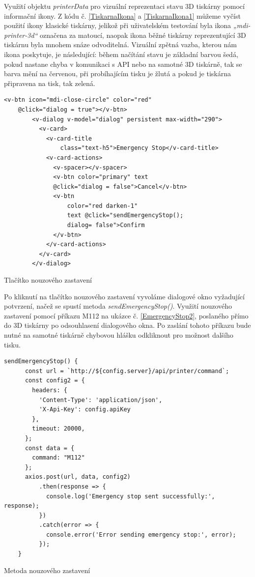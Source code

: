 \documentclass[twoside, 12pt]{article}
\begin{document}
Využití objektu \textit{printerData} pro vizuální reprezentaci stavu 3D tiskárny pomocí informační ikony. Z kódu č. \ref{TiskarnaIkona} a \ref{TiskarnaIkona1} můžeme vyčíst použití ikony klasické tiskárny, jelikož při uživatelském testování byla ikona \textit{„mdi-printer-3d“} označena za matoucí, naopak ikona běžné tiskárny reprezentující 3D tiskárnu byla mnohem snáze odvoditelná. Vizuální zpětná vazba, kterou nám ikona poskytuje, je následující: během načítání stavu je základní barvou šedá, pokud nastane chyba v komunikaci s API nebo na samotné 3D tiskárně, tak se barva mění na červenou, při probíhajícím tisku je žlutá a pokud je tiskárna připravena na tisk, tak zelená.


\begin{listing}
\begin{verbatim}
<v-btn icon="mdi-close-circle" color="red" 
    @click="dialog = true"></v-btn>
        <v-dialog v-model="dialog" persistent max-width="290">
          <v-card>
            <v-card-title 
                class="text-h5">Emergency Stop</v-card-title>
            <v-card-actions>
              <v-spacer></v-spacer>
              <v-btn color="primary" text 
              @click="dialog = false">Cancel</v-btn>
              <v-btn
                  color="red darken-1"
                  text @click="sendEmergencyStop();
                  dialog= false">Confirm
              </v-btn>
            </v-card-actions>
          </v-card>
        </v-dialog>
\end{verbatim}
\caption{Tlačítko nouzového zastavení}
\label{EmergencyStop}
\end{listing}

Po kliknutí na tlačítko nouzového zastavení vyvoláme dialogové okno vyžadující potvrzení, načež se spustí metoda \textit{sendEmergencyStop()}. Využití nouzového zastavení pomocí příkazu M112 na ukázce č. \ref{EmergencyStop2}, poslaného přímo do 3D tiskárny po odsouhlasení dialogového okna. Po zaslání tohoto příkazu bude nutné na samotné tiskárně chybovou hlášku odkliknout pro možnost dalšího tisku.


\begin{listing}
\begin{verbatim}
sendEmergencyStop() {
      const url = `http://${config.server}/api/printer/command`;
      const config2 = {
        headers: {
          'Content-Type': 'application/json',
          'X-Api-Key': config.apiKey
        },
        timeout: 20000,
      };
      const data = {
        command: "M112"
      };
      axios.post(url, data, config2)
          .then(response => {
            console.log('Emergency stop sent successfully:', response);
          })
          .catch(error => {
            console.error('Error sending emergency stop:', error);
          });
    }
\end{verbatim}
\caption{Metoda nouzového zastavení}
\label{EmergencyStop2}
\end{listing}
\end{document}
